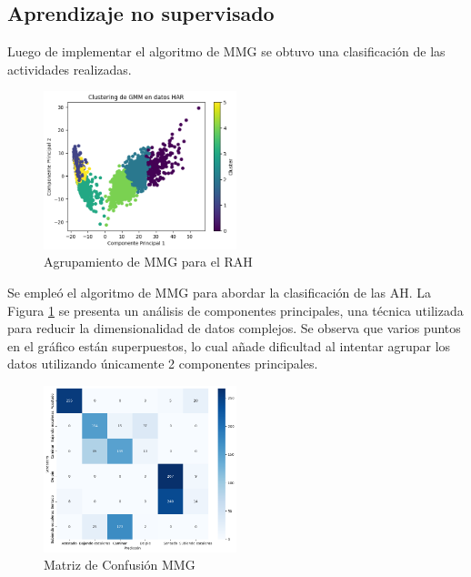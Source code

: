 \documentclass{esannV2}
\begin{document}
\subsection{Aprendizaje no supervisado}
Luego de implementar el algoritmo de MMG se obtuvo una clasificación de las actividades realizadas.
\begin{figure}[ht!]
\centering
\includegraphics[width=0.5\textwidth]{figs/Resultados.png}
\caption{Agrupamiento de MMG para el RAH}\label{Fig:resultados_MMG}
\end{figure}
Se empleó el algoritmo de MMG para abordar la clasificación de las AH. La Figura \ref{Fig:resultados_MMG} se presenta un análisis de componentes principales, una técnica utilizada para reducir la dimensionalidad de datos complejos. Se observa que varios puntos en el gráfico están superpuestos, lo cual añade dificultad al intentar agrupar los datos utilizando únicamente 2 componentes principales.

\begin{figure}[ht!]
\centering
\includegraphics[width=0.5\textwidth]{figs/GMM_matriz.png}
\caption{Matriz de Confusión MMG}\label{Fig:ggm_matriz}
\end{figure}
\end{document}
